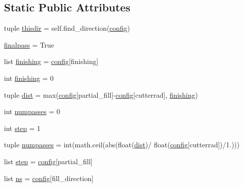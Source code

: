 \subsection*{Static Public Attributes}
\begin{DoxyCompactItemize}
\item 
tuple \hyperlink{classpath_1_1_path_aa035284a3ee351f3322692310a394019}{thisdir} = self.\+find\+\_\+direction(\hyperlink{classpath_1_1_path_a889e352f02dba833077975ce855276ed}{config})
\item 
\hyperlink{classpath_1_1_path_ad8b573890c87e26baed6baaca4d6510d}{finalpass} = True
\item 
list \hyperlink{classpath_1_1_path_a90d350ebcf02a6abf6f2b8d373707158}{finishing} = \hyperlink{classpath_1_1_path_a889e352f02dba833077975ce855276ed}{config}\mbox{[}\textquotesingle{}finishing\textquotesingle{}\mbox{]}
\item 
int \hyperlink{classpath_1_1_path_a90d350ebcf02a6abf6f2b8d373707158}{finishing} = 0
\item 
tuple \hyperlink{classpath_1_1_path_afec2f41c3bc8ffadb200eaf30e780ea5}{dist} = max(\hyperlink{classpath_1_1_path_a889e352f02dba833077975ce855276ed}{config}\mbox{[}\textquotesingle{}partial\+\_\+fill\textquotesingle{}\mbox{]}-\/\hyperlink{classpath_1_1_path_a889e352f02dba833077975ce855276ed}{config}\mbox{[}\textquotesingle{}cutterrad\textquotesingle{}\mbox{]}, \hyperlink{classpath_1_1_path_a90d350ebcf02a6abf6f2b8d373707158}{finishing})
\item 
int \hyperlink{classpath_1_1_path_a63daa52ac2ed46d3c512d22650245b86}{numpasses} = 0
\item 
int \hyperlink{classpath_1_1_path_a197eeae0afc70cd672c698e5aa7fda86}{step} = 1
\item 
tuple \hyperlink{classpath_1_1_path_a4c7bc21a39224d1712c3cacadf9dc8ca}{numpasses} = int(math.\+ceil(abs(float(\hyperlink{classpath_1_1_path_afec2f41c3bc8ffadb200eaf30e780ea5}{dist})/ float(\hyperlink{classpath_1_1_path_a889e352f02dba833077975ce855276ed}{config}\mbox{[}\textquotesingle{}cutterrad\textquotesingle{}\mbox{]})/1.)))
\item 
list \hyperlink{classpath_1_1_path_a6369a7d2acdd80e89933c87baa92a961}{step} = \hyperlink{classpath_1_1_path_a889e352f02dba833077975ce855276ed}{config}\mbox{[}\textquotesingle{}partial\+\_\+fill\textquotesingle{}\mbox{]}
\item 
list \hyperlink{classpath_1_1_path_acee5971500259152902b431cfae4248a}{ns} = \hyperlink{classpath_1_1_path_a889e352f02dba833077975ce855276ed}{config}\mbox{[}\textquotesingle{}fill\+\_\+direction\textquotesingle{}\mbox{]}

\end{DoxyCompactItemize}
